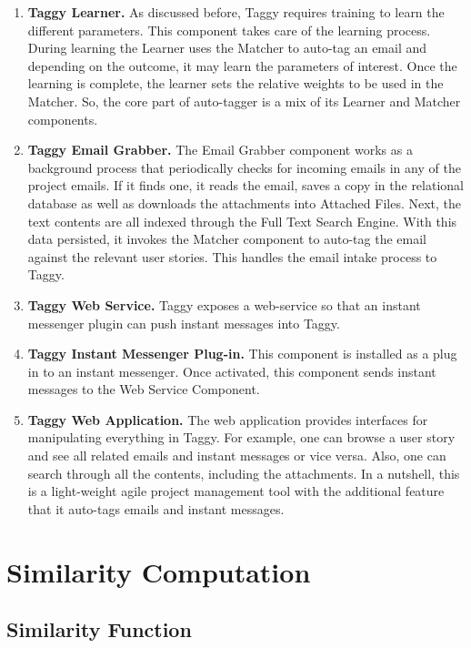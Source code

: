 \begin{enumerate}
	\item \textbf{Taggy Learner.} As discussed before, Taggy requires training to learn the different parameters. This component takes care of the learning process. During learning the Learner uses the Matcher to auto-tag an email and depending on the outcome, it may learn the parameters of interest. Once the learning is complete, the learner sets the relative weights to be used in the Matcher. So, the core part of auto-tagger is a mix of its Learner and Matcher components.
	
	\item \textbf{Taggy Email Grabber.} The Email Grabber component works as a background process that periodically checks for incoming emails in any of the project emails. If it finds one, it reads the email, saves a copy in the relational database as well as downloads the attachments into Attached Files. Next, the text contents are all indexed through the Full Text Search Engine. With this data persisted, it invokes the Matcher component to auto-tag the email against the relevant user stories. This handles the email intake process to Taggy.
	
	\item \textbf{Taggy Web Service.} Taggy exposes a web-service so that an instant messenger plugin can push instant messages into Taggy.
	
	\item \textbf{Taggy Instant Messenger Plug-in.} This component is installed as a plug in to an instant messenger. Once activated, this component sends instant messages to the Web Service Component.
	
	\item \textbf{Taggy Web Application.} The web application provides interfaces for manipulating everything in Taggy. For example, one can browse a user story and see all related emails and instant messages or vice versa. Also, one can search through all the contents, including the attachments. In a nutshell, this is a light-weight agile project management tool with the additional feature that it auto-tags emails and instant messages.
\end{enumerate}






\section{Similarity Computation}
	\subsection{Similarity Function}
